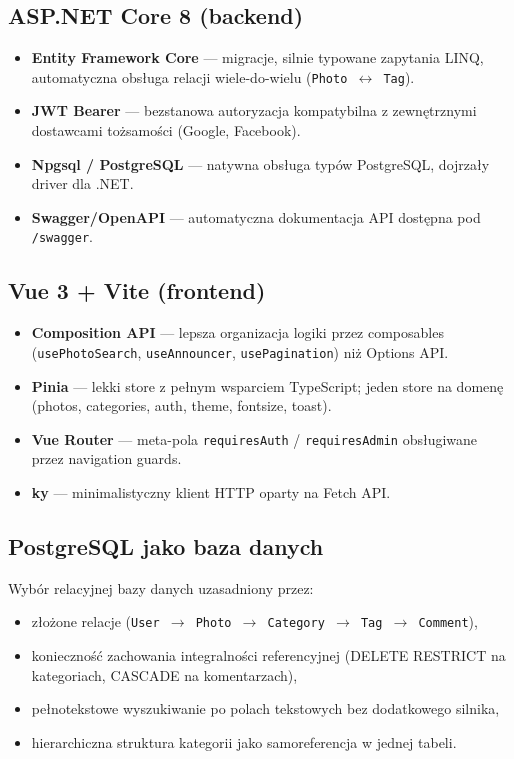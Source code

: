 \documentclass[12pt, a4paper]{article}
\begin{document}
\subsection{ASP.NET Core 8 (backend)}

\begin{itemize}
  \item \textbf{Entity Framework Core} --- migracje, silnie typowane zapytania LINQ,
        automatyczna obsługa relacji wiele-do-wielu (\texttt{Photo $\leftrightarrow$ Tag}).
  \item \textbf{JWT Bearer} --- bezstanowa autoryzacja kompatybilna z zewnętrznymi
        dostawcami tożsamości (Google, Facebook).
  \item \textbf{Npgsql / PostgreSQL} --- natywna obsługa typów PostgreSQL, dojrzały
        driver dla .NET.
  \item \textbf{Swagger/OpenAPI} --- automatyczna dokumentacja API dostępna pod \texttt{/swagger}.
\end{itemize}

\subsection{Vue 3 + Vite (frontend)}

\begin{itemize}
  \item \textbf{Composition API} --- lepsza organizacja logiki przez composables
        (\texttt{usePhotoSearch}, \texttt{useAnnouncer}, \texttt{usePagination})
        niż Options API.
  \item \textbf{Pinia} --- lekki store z pełnym wsparciem TypeScript;
        jeden store na domenę (photos, categories, auth, theme, fontsize, toast).
  \item \textbf{Vue Router} --- meta-pola \texttt{requiresAuth} / \texttt{requiresAdmin}
        obsługiwane przez navigation guards.
  \item \textbf{ky} --- minimalistyczny klient HTTP oparty na Fetch API.
\end{itemize}

\subsection{PostgreSQL jako baza danych}

Wybór relacyjnej bazy danych uzasadniony przez:

\begin{itemize}
  \item złożone relacje (\texttt{User $\to$ Photo $\to$ Category $\to$ Tag $\to$ Comment}),
  \item konieczność zachowania integralności referencyjnej (DELETE RESTRICT na kategoriach,
        CASCADE na komentarzach),
  \item pełnotekstowe wyszukiwanie po polach tekstowych bez dodatkowego silnika,
  \item hierarchiczna struktura kategorii jako samoreferencja w jednej tabeli.
\end{itemize}
\end{document}
